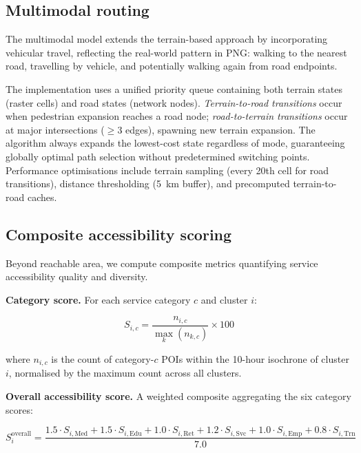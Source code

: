 \documentclass[review,3p,authoryear]{elsarticle}
\begin{document}
\subsection{Multimodal routing}

The multimodal model extends the terrain-based approach by incorporating vehicular travel, reflecting the real-world pattern in PNG: walking to the nearest road, travelling by vehicle, and potentially walking again from road endpoints.

The implementation uses a unified priority queue containing both terrain states (raster cells) and road states (network nodes). \textit{Terrain-to-road transitions} occur when pedestrian expansion reaches a road node; \textit{road-to-terrain transitions} occur at major intersections ($\geq$3 edges), spawning new terrain expansion. The algorithm always expands the lowest-cost state regardless of mode, guaranteeing globally optimal path selection without predetermined switching points. Performance optimisations include terrain sampling (every 20th cell for road transitions), distance thresholding (\SI{5}{\kilo\metre} buffer), and precomputed terrain-to-road caches.

\subsection{Composite accessibility scoring}

Beyond reachable area, we compute composite metrics quantifying service accessibility quality and diversity.

\textbf{Category score.} For each service category $c$ and cluster $i$:

\begin{equation}
S_{i,c} = \frac{n_{i,c}}{\max_k(n_{k,c})} \times 100
\label{eq:catscore}
\end{equation}

\noindent where $n_{i,c}$ is the count of category-$c$ POIs within the 10-hour isochrone of cluster $i$, normalised by the maximum count across all clusters.

\textbf{Overall accessibility score.} A weighted composite aggregating the six category scores:

\begin{equation}
S_i^{\text{overall}} = \frac{1.5 \cdot S_{i,\text{Med}} + 1.5 \cdot S_{i,\text{Edu}} + 1.0 \cdot S_{i,\text{Ret}} + 1.2 \cdot S_{i,\text{Svc}} + 1.0 \cdot S_{i,\text{Emp}} + 0.8 \cdot S_{i,\text{Trn}}}{7.0}
\label{eq:overall}
\end{equation}
\end{document}
